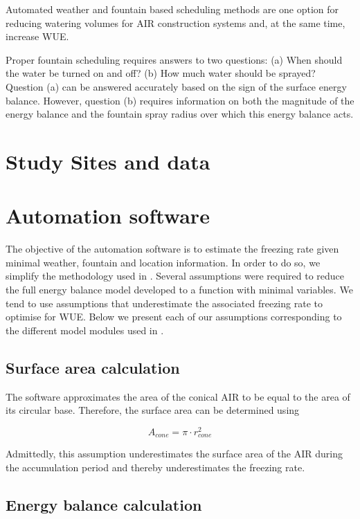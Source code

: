 \documentclass[utf8]{frontiersSCNS}
\begin{document}
Automated weather and fountain based scheduling methods are one option for reducing watering volumes for AIR
construction systems and, at the same time, increase WUE.

Proper fountain scheduling requires answers to two questions: (a) When should the water be turned on and off?
(b) How much water should be sprayed? Question (a) can be answered accurately based on the sign of the surface
energy balance. However, question (b) requires information on both the magnitude of the energy balance and the
fountain spray radius over which this energy balance acts.  

\section{Study Sites and data}

\section{Automation software}
The objective of the automation software is to estimate the freezing rate given minimal weather, fountain and
location information. In order to do so, we simplify the methodology used in \cite{Balasubramanian_2022}.
Several assumptions were required to reduce the full energy balance model developed to a function with minimal
variables. We tend to use assumptions that underestimate the associated freezing rate to optimise for WUE. Below
we present each of our assumptions corresponding to the different model modules used in
\cite{Balasubramanian_2022}. 

\subsection{Surface area calculation} \label{sec:shape}

The software approximates the area of the conical AIR to be equal to the area of its circular base. Therefore,
the surface area can be determined using

\begin{equation} A_{cone} =\pi \cdot r_{cone}^2 \label{eq:Area} \end{equation}

Admittedly, this assumption underestimates the surface area of the AIR during the accumulation period and
thereby underestimates the freezing rate.

\subsection{Energy balance calculation} \label{sec:energy}
\end{document}
